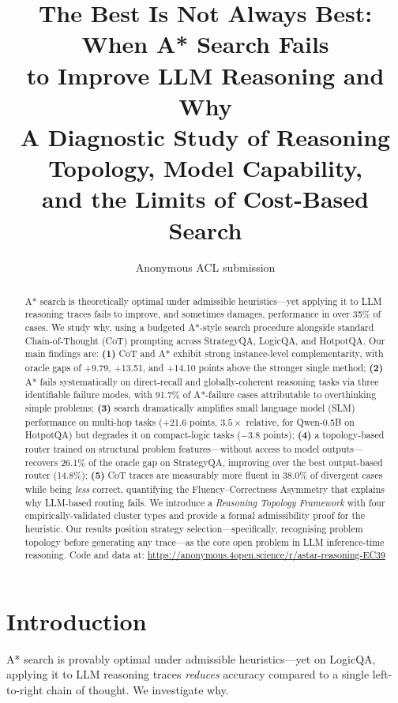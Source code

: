 \documentclass[11pt]{article}
\title{\textbf{The Best Is Not Always Best: When A* Search Fails\\
to Improve LLM Reasoning and Why}\\[4pt]
{\large A Diagnostic Study of Reasoning Topology, Model Capability,\\
and the Limits of Cost-Based Search}}
\author{Anonymous ACL submission}
\date{}
\begin{document}
\maketitle

\begin{abstract}
A* search is theoretically optimal under admissible heuristics—yet applying it to LLM reasoning traces fails to improve, and sometimes damages, performance in over 35\% of cases. We study why, using a budgeted A*-style search procedure alongside standard Chain-of-Thought (CoT) prompting across StrategyQA, LogicQA, and HotpotQA. Our main findings are: \textbf{(1)} CoT and A* exhibit strong instance-level complementarity, with oracle gaps of +9.79, +13.51, and +14.10 points above the stronger single method; \textbf{(2)} A* fails systematically on direct-recall and globally-coherent reasoning tasks via three identifiable failure modes, with 91.7\% of A*-failure cases attributable to overthinking simple problems; \textbf{(3)} search dramatically amplifies small language model (SLM) performance on multi-hop tasks (+21.6 points, $3.5\times$ relative, for Qwen-0.5B on HotpotQA) but degrades it on compact-logic tasks ($-3.8$ points); \textbf{(4)} a topology-based router trained on structural problem features—without access to model outputs—recovers 26.1\% of the oracle gap on StrategyQA, improving over the best output-based router (14.8\%); \textbf{(5)} CoT traces are measurably more fluent in 38.0\% of divergent cases while being \emph{less} correct, quantifying the Fluency--Correctness Asymmetry that explains why LLM-based routing fails. We introduce a \textit{Reasoning Topology Framework} with four empirically-validated cluster types and provide a formal admissibility proof for the heuristic. Our results position strategy selection—specifically, recognising problem topology before generating any trace—as the core open problem in LLM inference-time reasoning. Code and data at: \url{https://anonymous.4open.science/r/astar-reasoning-EC39}
\end{abstract}

\section{Introduction}
\label{sec:intro}

A* search is provably optimal under admissible heuristics—yet on LogicQA, applying it to LLM reasoning traces \emph{reduces} accuracy compared to a single left-to-right chain of thought. We investigate why.
\end{document}
